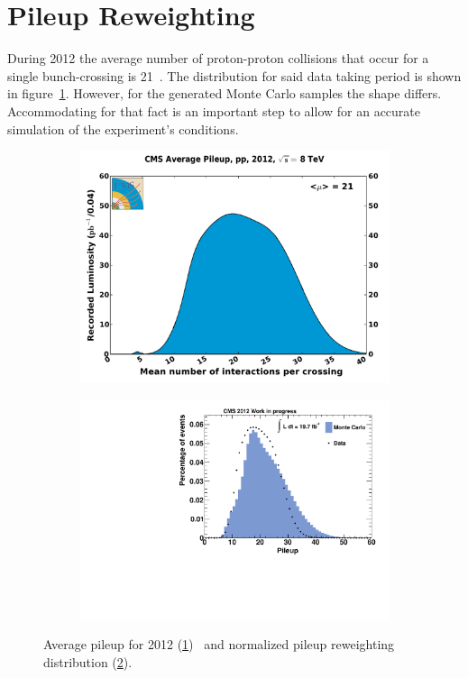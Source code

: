 \section{Pileup Reweighting}
\label{sec:pileup}

During 2012 the average number of proton-proton collisions that occur for a single bunch-crossing is 21~\cite{cmslumi}. The distribution for said data taking period is shown in figure~\ref{fig:pileup2012}. However, for the generated Monte Carlo samples the shape differs. Accommodating for that fact is an important step to allow for an accurate simulation of the experiment's conditions.

\begin{figure}[htb!]
  \centering
  \begin{subfigure}[b]{0.495\textwidth}
    \centering
    \includegraphics[width=\textwidth]{plots/pileup_pp_2012.pdf}
    \caption{\label{fig:pileup2012}}
  \end{subfigure}
  \begin{subfigure}[b]{0.495\textwidth}
    \centering
    \includegraphics[width=\textwidth]{plots/pileup.pdf}
    \caption{\label{fig:pileup}}
  \end{subfigure}
  \caption{Average pileup for 2012 (\ref{fig:pileup2012})~\cite{cmslumi} and normalized pileup reweighting distribution (\ref{fig:pileup}).}
  \label{fig:pileups}
\end{figure}


